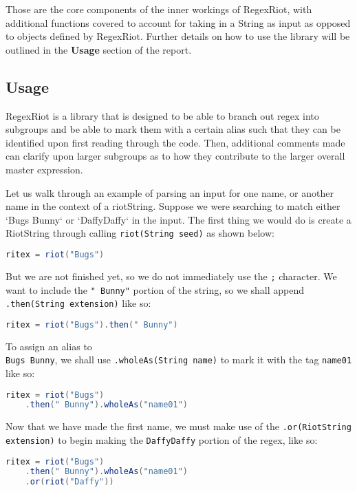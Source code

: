 \documentclass[conference]{IEEEtran}
\begin{document}
Those are the core components of the inner workings of RegexRiot,
with additional functions covered to account for taking in a String
as input as opposed to objects defined by RegexRiot.
Further details on how to use the library will be outlined in
the \textbf{Usage} section of the report.

\subsection{Usage}
RegexRiot is a library that is designed to be able to branch out regex into
subgroups and be able to mark them with a certain alias such that they can
be identified upon first reading through the code. Then, additional
comments made can clarify upon larger subgroups as to how they
contribute to the larger overall master expression.

Let us walk through an example of parsing an input for one name,
or another name in the context of a riotString.
Suppose we were searching to match either `Bugs Bunny`
or `DaffyDaffy` in the input. The first thing we would do is
create a RiotString through calling \texttt{riot(String seed)} as shown below:

\begin{lstlisting}[language=Java]
ritex = riot("Bugs")
\end{lstlisting}

But we are not finished yet, so we do not immediately use the \texttt{;}
character. We want to include the \texttt{" Bunny"} portion of the string,
so we shall append \\
\texttt{.then(String extension)} like so:

\begin{lstlisting}[language=Java]
ritex = riot("Bugs").then(" Bunny")
\end{lstlisting}

To assign an alias to \\
\texttt{Bugs Bunny}, we shall use \texttt{.wholeAs(String name)}
to mark it with the tag \texttt{name01} like so:

\begin{lstlisting}[language=Java]
ritex = riot("Bugs")
    .then(" Bunny").wholeAs("name01")
\end{lstlisting}

Now that we have made the first name, we must make use of the
\texttt{.or(RiotString extension)} to begin making the \texttt{DaffyDaffy}
portion of the regex, like so:

\begin{lstlisting}[language=Java]
ritex = riot("Bugs")
    .then(" Bunny").wholeAs("name01")
    .or(riot("Daffy"))
\end{lstlisting}
\end{document}
